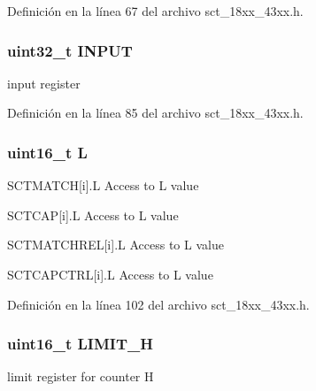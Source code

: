 Definición en la línea 67 del archivo sct\+\_\+18xx\+\_\+43xx.\+h.

\subsubsection[{\texorpdfstring{I\+N\+P\+UT}{INPUT}}]{ uint32\+\_\+t I\+N\+P\+UT}\hypertarget{struct_l_p_c___s_c_t___t_a2ff5b581011871d934e56958ac7f8dd7}{}\label{struct_l_p_c___s_c_t___t_a2ff5b581011871d934e56958ac7f8dd7}
input register 

Definición en la línea 85 del archivo sct\+\_\+18xx\+\_\+43xx.\+h.

\subsubsection[{\texorpdfstring{L}{L}}]{\setlength{\rightskip}{0pt plus 5cm}uint16\+\_\+t L}\hypertarget{struct_l_p_c___s_c_t___t_aa5ab268b51e8f1f09f30dfb58369b22a}{}\label{struct_l_p_c___s_c_t___t_aa5ab268b51e8f1f09f30dfb58369b22a}
S\+C\+T\+M\+A\+T\+CH\mbox{[}i\mbox{]}.L Access to L value

S\+C\+T\+C\+AP\mbox{[}i\mbox{]}.L Access to L value

S\+C\+T\+M\+A\+T\+C\+H\+R\+EL\mbox{[}i\mbox{]}.L Access to L value

S\+C\+T\+C\+A\+P\+C\+T\+RL\mbox{[}i\mbox{]}.L Access to L value 

Definición en la línea 102 del archivo sct\+\_\+18xx\+\_\+43xx.\+h.

\subsubsection[{\texorpdfstring{L\+I\+M\+I\+T\+\_\+H}{LIMIT_H}}]{ uint16\+\_\+t L\+I\+M\+I\+T\+\_\+H}\hypertarget{struct_l_p_c___s_c_t___t_a42207e9fd614692bfff4175416eb23cd}{}\label{struct_l_p_c___s_c_t___t_a42207e9fd614692bfff4175416eb23cd}
limit register for counter H 


